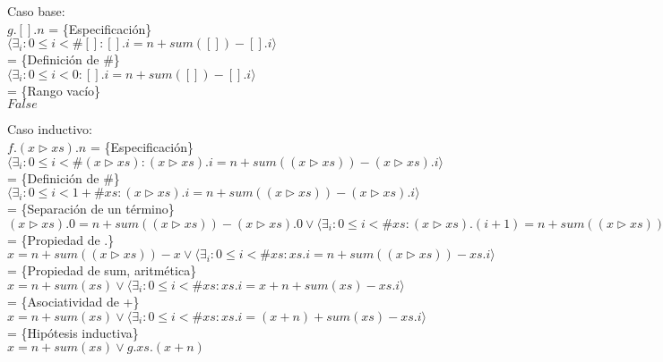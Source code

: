 \documentclass[12pt]{article}
\begin{document}
\begin{itemize}
    \bigbreak

    Caso base:\\
    $ g.[].n $
    = \{Especificación\}\\
    $ \langle \exists_i : 0 \le i < \#[] : [].i = n + sum([]) - [].i \rangle $\\
    = \{Definición de \#\}\\
    $ \langle \exists_i : 0 \le i < 0 : [].i = n + sum([]) - [].i \rangle $\\
    = \{Rango vacío\}\\
    $ False $

    \bigbreak

    Caso inductivo:\\
    $ f.(x \triangleright xs).n $
    = \{Especificación\}\\
    $ \langle \exists_i : 0 \le i < \#(x \triangleright xs) : (x \triangleright xs).i = n + sum((x \triangleright xs)) - (x \triangleright xs).i \rangle $\\
    = \{Definición de \#\}\\
    $ \langle \exists_i : 0 \le i < 1 + \#xs : (x \triangleright xs).i = n + sum((x \triangleright xs)) - (x \triangleright xs).i \rangle $\\
    = \{Separación de un término\}\\
    $ (x \triangleright xs).0 = n + sum((x \triangleright xs)) - (x \triangleright xs).0 \lor \langle \exists_i : 0 \le i < \#xs : (x \triangleright xs).(i + 1) = n + sum((x \triangleright xs)) - (x \triangleright xs).(i + 1) \rangle $\\
    = \{Propiedad de .\}\\
    $ x = n + sum((x \triangleright xs)) - x \lor \langle \exists_i : 0 \le i < \#xs : xs.i = n + sum((x \triangleright xs)) - xs.i \rangle $\\
    = \{Propiedad de sum, aritmética\}\\
    $ x = n + sum(xs) \lor \langle \exists_i : 0 \le i < \#xs : xs.i = x + n + sum(xs) - xs.i \rangle $\\
    = \{Asociatividad de +\}\\
    $ x = n + sum(xs) \lor \langle \exists_i : 0 \le i < \#xs : xs.i = (x + n) + sum(xs) - xs.i \rangle $\\
    = \{Hipótesis inductiva\}\\
    $ x = n + sum(xs) \lor g.xs.(x + n) $

    \bigbreak


\end{itemize}
\end{document}
